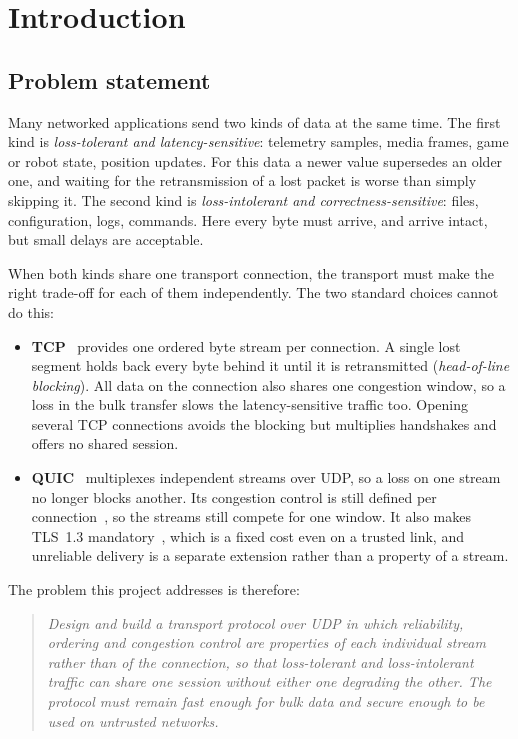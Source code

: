 \chapter{Introduction}\label{ch:intro}

\section{Problem statement}

Many networked applications send two kinds of data at the same time. The first kind is \emph{loss-tolerant and
latency-sensitive}: telemetry samples, media frames, game or robot state, position updates. For this data a
newer value supersedes an older one, and waiting for the retransmission of a lost packet is worse than simply
skipping it. The second kind is \emph{loss-intolerant and correctness-sensitive}: files, configuration, logs,
commands. Here every byte must arrive, and arrive intact, but small delays are acceptable.

When both kinds share one transport connection, the transport must make the right trade-off for each of them
independently. The two standard choices cannot do this:

\begin{itemize}
  \item \textbf{TCP}~\cite{rfc9293} provides one ordered byte stream per connection. A single lost segment holds
    back every byte behind it until it is retransmitted (\emph{head-of-line blocking}). All data on the
    connection also shares one congestion window, so a loss in the bulk transfer slows the latency-sensitive
    traffic too. Opening several TCP connections avoids the blocking but multiplies handshakes and offers no
    shared session.
  \item \textbf{QUIC}~\cite{rfc9000,quic-design} multiplexes independent streams over UDP, so a loss on one
    stream no longer blocks another. Its congestion control is still defined per connection~\cite{rfc9002}, so
    the streams still compete for one window. It also makes TLS~1.3 mandatory~\cite{rfc9001}, which is a fixed
    cost even on a trusted link, and unreliable delivery is a separate extension rather than a property of a
    stream.
\end{itemize}

\noindent The problem this project addresses is therefore:

\begin{quote}
\emph{Design and build a transport protocol over UDP in which reliability, ordering and congestion control are
properties of each individual stream rather than of the connection, so that loss-tolerant and loss-intolerant
traffic can share one session without either one degrading the other. The protocol must remain fast enough for
bulk data and secure enough to be used on untrusted networks.}
\end{quote}

